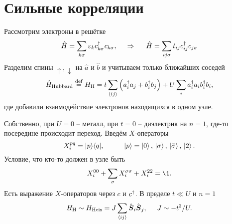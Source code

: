 \section{Сильные корреляции}



Рассмотрим электроны в решётке
\begin{equation*}
	\hat{H} = \sum_{k \sigma} \varepsilon_k c_{k \sigma}^{\dag} c_{k \sigma},
	\hspace{0.5cm} \Rightarrow \hspace{0.5cm}
	\hat{H} = \sum_{ij\sigma} t_{ij} c_{ij}^{\dag} c_{j \sigma}
\end{equation*}
Разделим спины $\uparrow, \downarrow$ на $\hat{a}$ и $\hat{b}$ и учитываем только ближайших соседей
\begin{equation}
	\hat{H}_{\textnormal{Hubbard}} \overset{\mathrm{def}}{=} H_{\textnormal{H}} =  t \sum_{\langle ij\rangle} \left(
		a_i^{\dag} a_j + b_i^{\dag} b_j
	\right) + 
	U \sum_i a_i^{\dag} a_i b_i^{\dag} b_i,
\end{equation}
где добавили взаимодействие электронов находящихся в одном узле. 

Собственно, при $U=0$ -- металл, при $t=0$ -- диэлектрик на $n=1$, где-то посередине происходит переход. Введём $X$-операторы
\begin{equation*}
	X_i^{pq} = |p \rangle \langle q|,
	\hspace{10 mm} 
	\ket{p} = \ket{0},\, \ket{\sigma},\, \ket{\bar{\sigma}},\, \ket{2}.
\end{equation*}
Условие, что кто-то должен в узле быть
\begin{equation*}
	X_i^{00} + \sum_\sigma X_i^{\sigma \sigma} + X_i^{22} = \1.
\end{equation*}
Есть выражение $X$-операторов через $c$ и $c^{\dag}$. В пределе $t \ll U$ и $n=1$
\begin{equation*}
	H_{\textnormal{H}} \sim H_{\textnormal{Heis}} = J \sum_{\langle ij\rangle} \hat{\boldsymbol{S}}_i \hat{\boldsymbol{S}}_j,
	\hspace{5 mm} 
	J \sim - t^2/U.
\end{equation*}











